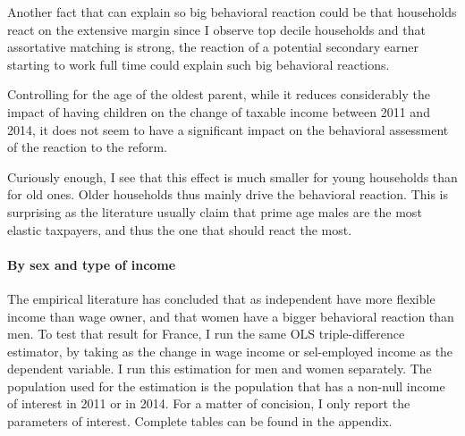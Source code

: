  
 Another fact that can explain so big behavioral reaction could be that households react on the extensive margin since I observe top decile households and that assortative matching is strong, the reaction of a potential secondary earner starting to work full time could explain such big behavioral reactions.

Controlling for the age of the oldest parent, while it reduces considerably the impact of having children on the change of taxable income between 2011 and 2014, it does not seem to have a significant impact on the behavioral assessment of the reaction to the reform.


Curiously enough, I see that this effect is much smaller for young households than for old ones. Older households thus mainly drive the behavioral reaction. This is surprising as the literature usually claim that prime age males are the most elastic taxpayers, and thus the one that should react the most.






\paragraph{By sex and type of income}
The empirical literature has concluded that as independent have more flexible income than wage owner, and that women have a bigger behavioral reaction than men. To test that result for France, I run the same OLS triple-difference estimator, by taking as the change in wage income or sel-employed income as the dependent variable. I run this estimation for men and women separately. The population used for the estimation is the population that has a non-null income of interest in 2011 or in 2014. For a matter of concision, I only report the parameters of interest. Complete tables can be found in the appendix.

